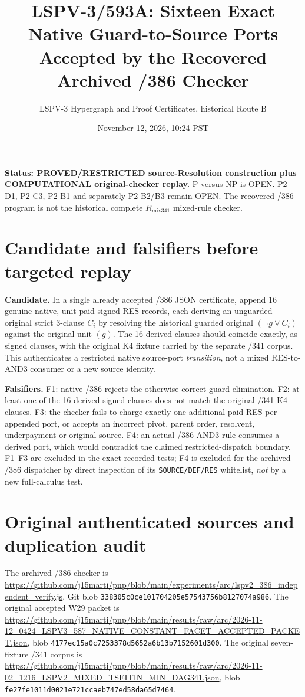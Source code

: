 \documentclass[11pt]{article}
\title{LSPV-3/593A: Sixteen Exact Native Guard-to-Source Ports\\
Accepted by the Recovered Archived /386 Checker}
\author{LSPV-3 Hypergraph and Proof Certificates, historical Route B}
\date{November 12, 2026, 10:24 PST}
\begin{document}
\maketitle

\noindent\textbf{Status: PROVED/RESTRICTED source-Resolution construction plus
COMPUTATIONAL original-checker replay.} P versus NP is OPEN.
P2-D1, P2-C3, P2-B1 and separately P2-B2/B3 remain OPEN.
The recovered /386 program is not the historical complete
$R_{\mathrm{mix341}}$ mixed-rule checker.

\section*{Candidate and falsifiers before targeted replay}
\noindent\textbf{Candidate.} In a single already accepted /386 JSON certificate,
append 16 genuine native, unit-paid signed RES records, each deriving
an unguarded original strict 3-clause $C_i$ by resolving the historical
guarded original $(\neg g\lor C_i)$ against the original unit $(g)$.
The 16 derived clauses should coincide exactly, as signed clauses,
with the original K4 fixture carried by the separate /341 corpus.
This authenticates a restricted native source-port \emph{transition},
not a mixed RES-to-AND3 consumer or a new source identity.

\noindent\textbf{Falsifiers.} F1: native /386 rejects the otherwise correct
guard elimination. F2: at least one of the 16 derived signed clauses
does not match the original /341 K4 clauses. F3: the checker fails
to charge exactly one additional paid RES per appended port, or accepts
an incorrect pivot, parent order, resolvent, underpayment or original
source. F4: an actual /386 AND3 rule consumes a derived port, which
would contradict the claimed restricted-dispatch boundary.
F1--F3 are excluded in the exact recorded tests; F4 is excluded for
the archived /386 dispatcher by direct inspection of its
\texttt{SOURCE/DEF/RES} whitelist, \emph{not} by a new full-calculus test.

\section*{Original authenticated sources and duplication audit}
The archived /386 checker is
\url{https://github.com/j15marti/pnp/blob/main/experiments/arc/lspv2_386_independent_verify.js},
Git blob \texttt{338305c0ce101704205e57543756b8127074a986}.
The original accepted W29 packet is
\url{https://github.com/j15marti/pnp/blob/main/results/raw/arc/2026-11-12_0424_LSPV3_587_NATIVE_CONSTANT_FACET_ACCEPTED_PACKET.json},
blob \texttt{4177ec15a0c7253378d5652a6b13b7152601d300}.
The original seven-fixture /341 corpus is
\url{https://github.com/j15marti/pnp/blob/main/results/raw/arc/2026-11-02_1216_LSPV2_MIXED_TSEITIN_MIN_DAG341.json},
blob \texttt{fe27fe1011d0021e721ccaeb747ed58da65d7464}.
\end{document}
